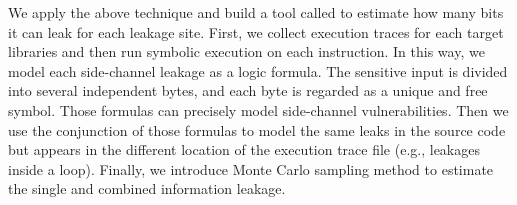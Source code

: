 We apply the above technique and build a tool called \tool{} to estimate how
many bits it can leak for each leakage site. 
First, we collect execution traces for each target
libraries and then run symbolic execution on each instruction. In this way, we model
each side-channel leakage as a logic formula. The sensitive input is divided into
several independent bytes, and each byte is regarded as a unique and free symbol. Those
formulas can precisely model side-channel vulnerabilities. Then we use the conjunction
of those formulas to model the same leaks in the source code but appears in the different location of
the execution trace file (e.g., leakages inside a loop).
Finally, we introduce Monte Carlo sampling method to estimate the single and combined information leakage. 






